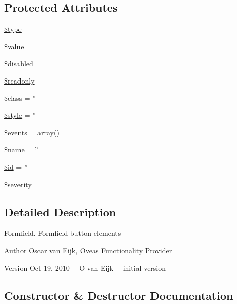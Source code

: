 \subsection*{Protected Attributes}
\begin{DoxyCompactItemize}
\item 
\hyperlink{classFormFieldPlugin_acf8210731f7b8dcee47d777975bc91ca}{\$type}
\item 
\hyperlink{classFormFieldPlugin_abbe128149202f43e8fcac8184018048c}{\$value}
\item 
\hyperlink{classFormFieldPlugin_a2e589ab9610052dfbba6170d6117be37}{\$disabled}
\item 
\hyperlink{classFormFieldPlugin_a707acf02de21b2b7975b2aa362615ce0}{\$readonly}
\item 
\hyperlink{classBaseElement_a99976a8e967db92e7800309f359b0803}{\$class} = ''
\item 
\hyperlink{classBaseElement_a429a3d642dd95f30e1059ef29564b87d}{\$style} = ''
\item 
\hyperlink{classBaseElement_a02cebe45d277b4ff8f29db08bad371ba}{\$events} = array()
\item 
\hyperlink{classBaseElement_a30b8cff187a9de659a70daf287d66f45}{\$name} = ''
\item 
\hyperlink{classBaseElement_a11b6989c43b53869a09f5ce65aa55b45}{\$id} = ''
\item 
\hyperlink{class__OWL_ad26b40a9dbbacb33e299b17826f8327c}{\$severity}
\end{DoxyCompactItemize}


\subsection{Detailed Description}
Formfield. Formfield button elements \begin{DoxyAuthor}{Author}
Oscar van Eijk, Oveas Functionality Provider 
\end{DoxyAuthor}
\begin{DoxyVersion}{Version}
Oct 19, 2010 -\/-\/ O van Eijk -\/-\/ initial version 
\end{DoxyVersion}


\subsection{Constructor \& Destructor Documentation}
